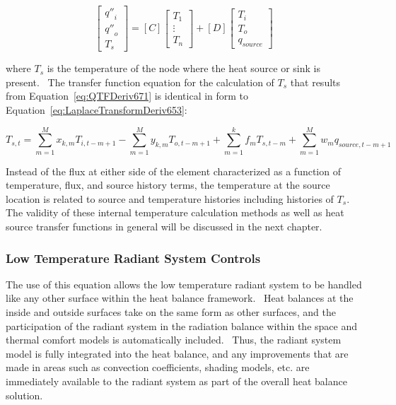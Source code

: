 \begin{equation}
\left[ {\begin{array}{ccc}{{{q''}_i}}\\ {{{q''}_o}}\\ {{T_s}}\end{array}} \right] = \left[ C \right]\left[ {\begin{array}{ccc}{{T_1}}\\ \vdots \\ {{T_n}}\end{array}} \right] + \left[ D \right]\left[ {\begin{array}{ccc}{{T_i}}\\ {{T_o}}\\ {{q_{source}}}\end{array}} \right]
\label{eq:QTFDeriv671}
\end{equation}

where \(T_s\) is the temperature of the node where the heat source or sink is present.~ The transfer function equation for the calculation of \(T_s\) that results from Equation~\ref{eq:QTFDeriv671} is identical in form to Equation~\ref{eq:LaplaceTransformDeriv653}:

\begin{equation}
{T_{s,t}} = \sum\limits_{m = 1}^M {{x_{k,m}}{T_{i,t - m + 1}}}  - \sum\limits_{m = 1}^M {{y_{k,m}}{T_{o,t - m + 1}}}  + \sum\limits_{m = 1}^k {{f_m}{T_{s,t - m}}}  + \sum\limits_{m = 1}^M {{w_m}{q_{source,t - m + 1}}}
\label{eq:QTFDeriv672}
\end{equation}

Instead of the flux at either side of the element characterized as a function of temperature, flux, and source history terms, the temperature at the source location is related to source and temperature histories including histories of \(T_s\).~ The validity of these internal temperature calculation methods as well as heat source transfer functions in general will be discussed in the next chapter.

\subsubsection{Low Temperature Radiant System Controls}\label{low-temperature-radiant-system-controls}

The use of this equation allows the low temperature radiant system to be handled like any other surface within the heat balance framework.~ Heat balances at the inside and outside surfaces take on the same form as other surfaces, and the participation of the radiant system in the radiation balance within the space and thermal comfort models is automatically included.~ Thus, the radiant system model is fully integrated into the heat balance, and any improvements that are made in areas such as convection coefficients, shading models, etc. are immediately available to the radiant system as part of the overall heat balance solution.

